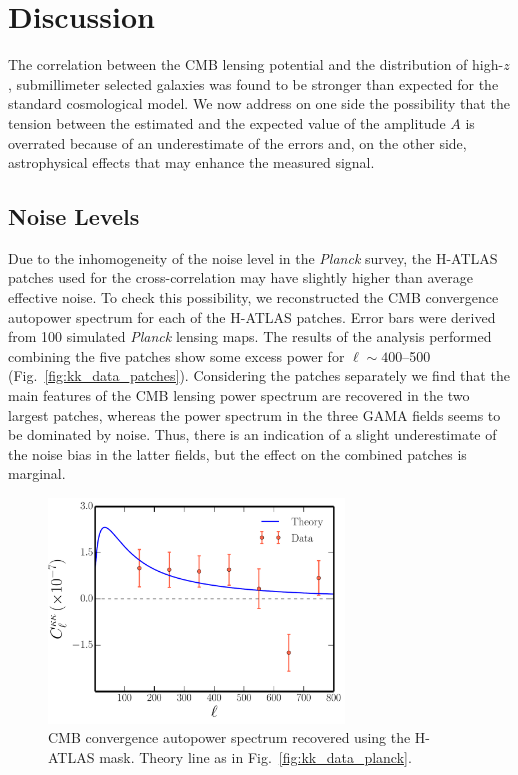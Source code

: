 \section{Discussion} \label{sec:discussionxc1}

The correlation between the \gls{CMB} lensing potential and the distribution of high-$z$, submillimeter selected galaxies was found to be stronger than expected for the standard cosmological model. We now address on one side the possibility that the tension between the estimated and the expected value of the amplitude $A$ is overrated because of an underestimate of  the errors and, on the other side, astrophysical effects that may enhance the measured signal.

\subsection{Noise Levels}

Due to the inhomogeneity of the noise level in the \emph{Planck} survey, the H-ATLAS patches used for the cross-correlation may have slightly higher than average effective noise. To check this possibility, we reconstructed the \gls{CMB} convergence autopower spectrum for each of the H-ATLAS patches. Error bars were derived from 100 simulated \emph{Planck} lensing maps.  The results of the analysis performed combining the five patches show some excess power for $\ell \sim 400$--500  (Fig.~\eqref{fig:kk_data_patches}). Considering the patches separately we find that the main features of the \gls{CMB} lensing power spectrum are recovered in the two largest patches, whereas the power spectrum in the three GAMA fields seems to be dominated by noise. Thus, there is an indication of a slight underestimate of the noise bias in the latter fields, but the effect on the combined patches is marginal.

\begin{figure} %
\centering %
\includegraphics[width=0.7\textwidth]{Chapter3/Images/f15}
\caption{\gls{CMB} convergence autopower spectrum recovered using the H-ATLAS mask. Theory line as in Fig.~\eqref{fig:kk_data_planck}. \label{fig:kk_data_patches}}
\end{figure}

